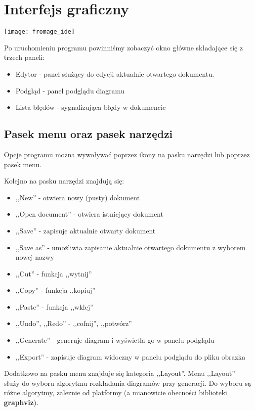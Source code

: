 \section{Interfejs graficzny}

\begin{center}
	\texttt{[image: fromage\_ide]}
\end{center}

Po uruchomieniu programu powinniśmy zobaczyć okno główne składające się z trzech paneli:

\begin{itemize}
	\item Edytor - panel służący do edycji aktualnie otwartego dokumentu.
	\item Podgląd - panel podglądu diagramu
	\item Lista błędów - sygnalizująca błędy w dokumencie
\end{itemize}

\subsection{Pasek menu oraz pasek narzędzi}
Opcje programu można wywoływać poprzez ikony na pasku narzędzi lub poprzez pasek menu.

Kolejno na pasku narzędzi znajdują się:
\begin{itemize}
	\item ,,New'' - otwiera nowy (pusty) dokument
	\item ,,Open document'' - otwiera istniejący dokument
	\item ,,Save'' - zapisuje aktualnie otwarty dokument
	\item ,,Save as'' - umożliwia zapisanie aktualnie otwartego dokumentu z wyborem nowej nazwy
	\item ,,Cut'' - funkcja ,,wytnij''
	\item ,,Copy'' - funkcja ,,kopiuj''
	\item ,,Paste'' - funkcja ,,wklej''
	\item ,,Undo'', ,,Redo'' - ,,cofnij'', ,,potwórz''
	\item ,,Generate'' - generuje diagram i wyświetla go w panelu podglądu
	\item ,,Export'' - zapisuje diagram widoczny w panelu podglądu do pliku obrazka
\end{itemize}

Dodatkowo na pasku menu znajduje się kategoria ,,Layout''. Menu ,,Layout'' służy do wyboru algorytmu rozkładania diagramów przy generacji. Do wyboru są różne algorytmy, zaleznie od platformy (a mianowicie obecności biblioteki \textbf{graphviz}).

